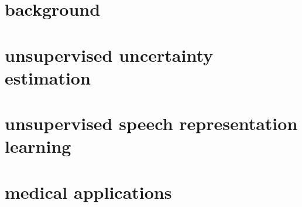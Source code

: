 \documentclass[\classfontsize,\papersize,twoside,showtrims,extrafontsizes]{memoir}  %
\begin{document}
\prefrontmatter

\cleartoevenpage

\cleartooddpage

\cleartoevenpage

\frontmatter





% 




\clearforchapter
\tableofcontents*

\clearforchapter
\mylistoftodos

\mainmatter

\part[background]{background}\label{part:background}





\part[unsupervised uncertainty estimation]{unsupervised uncertainty estimation}\label{part:unsupervised-uncertainty-estimation}



\part[unsupervised speech representation learning]{unsupervised speech representation learning}\label{part:unsupervised-speech-representation-learning}


\part[medical applications]{medical applications}\label{part:medical-applications}


\end{document}
